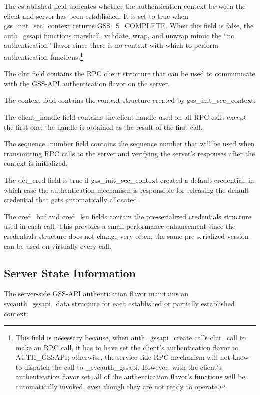 The established field indicates whether the authentication context
between the client and server has been established.  It is set to true
when gss_init_sec_context returns GSS_S_COM\-PLETE.  When this field is
false, the auth_gssapi functions marshall, validate, wrap, and unwrap
mimic the ``no authentication'' flavor since there is no context with
which to perform authentication functions.\footnote{This field is
necessary because, when auth_gssapi_create calls clnt_call to make an
RPC call, it has to have set the client's authentication flavor to
AUTH_GSSAPI; otherwise, the service-side RPC mechanism will not know
to dispatch the call to _svcauth_gssapi.  However, with the client's
authentication flavor set, all of the authentication flavor's
functions will be automatically invoked, even though they are not
ready to operate.}

The clnt field contains the RPC client structure that can be used to
communicate with the GSS-API authentication flavor on the server.

The context field contains the context structure created by
gss_init_sec_context.

The client_handle field contains the client handle used on all RPC
calls except the first one; the handle is obtained as the result of
the first call.

The sequence_number field contains the sequence number that will be
used when transmitting RPC calls to the server and verifying the
server's responses after the context is initialized.

The def_cred field is true if gss_init_sec_context created a default
credential, in which case the authentication mechanism is responsible
for releasing the default credential that gets automatically
allocated.

The cred_buf and cred_len fields contain the pre-serialized
credentials structure used in each call.  This provides a small
performance enhancement since the credentials structure does not
change very often; the same pre-serialized version can be used on
virtually every call.

\subsection{Server State Information}
\label{sec:server-state}

The server-side GSS-API authentication flavor maintains an
svcauth_gssapi_data structure for each established or partially
established context:

